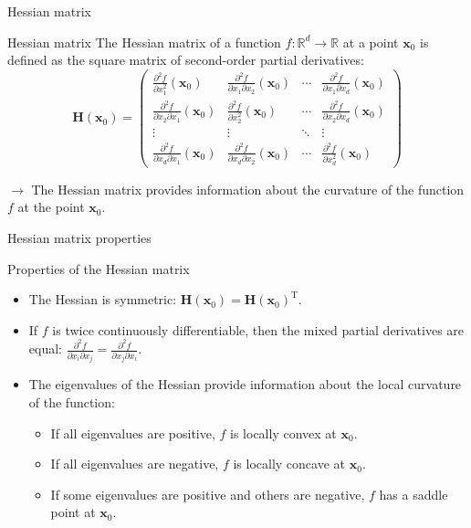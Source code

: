 \documentclass[aspectratio=1610]{beamer}
\begin{document}
\begin{frame}{Hessian matrix}

  \begin{block}{Hessian matrix}
    The Hessian matrix of a function $f:\mathbb{R}^d \to \mathbb{R}$ at a point $\mathbf{x}_0$ is defined as the square matrix of second-order partial derivatives:
    $$\mathbf{H}(\mathbf{x}_0) = \begin{pmatrix}
      \frac{\partial^2 f}{\partial x_1^2}(\mathbf{x}_0) & \frac{\partial^2 f}{\partial x_1 \partial x_2}(\mathbf{x}_0) & \cdots & \frac{\partial^2 f}{\partial x_1 \partial x_d}(\mathbf{x}_0) \\
      \frac{\partial^2 f}{\partial x_2 \partial x_1}(\mathbf{x}_0) & \frac{\partial^2 f}{\partial x_2^2}(\mathbf{x}_0) & \cdots & \frac{\partial^2 f}{\partial x_2 \partial x_d}(\mathbf{x}_0) \\
      \vdots & \vdots & \ddots & \vdots \\
      \frac{\partial^2 f}{\partial x_d \partial x_1}(\mathbf{x}_0) & \frac{\partial^2 f}{\partial x_d \partial x_2}(\mathbf{x}_0) & \cdots & \frac{\partial^2 f}{\partial x_d^2}(\mathbf{x}_0)
    \end{pmatrix}$$
  \end{block}

  $\rightarrow$ The Hessian matrix provides information about the curvature of the function $f$ at the point $\mathbf{x}_0$.
\end{frame}


\begin{frame}{Hessian matrix properties}

  \begin{block}{Properties of the Hessian matrix}
    \begin{itemize}
      \item The Hessian is symmetric: $\mathbf{H}(\mathbf{x}_0) = \mathbf{H}(\mathbf{x}_0)^\mathrm{T}$.
      \item If $f$ is twice continuously differentiable, then the mixed partial derivatives are equal: $\frac{\partial^2 f}{\partial x_i \partial x_j} = \frac{\partial^2 f}{\partial x_j \partial x_i}$.
      \item The eigenvalues of the Hessian provide information about the local curvature of the function:
        \begin{itemize}
          \item If all eigenvalues are positive, $f$ is locally convex at $\mathbf{x}_0$.
          \item If all eigenvalues are negative, $f$ is locally concave at $\mathbf{x}_0$.
          \item If some eigenvalues are positive and others are negative, $f$ has a saddle point at $\mathbf{x}_0$.
        \end{itemize}
    \end{itemize}
  \end{block}
\end{frame}
  
\end{document}
